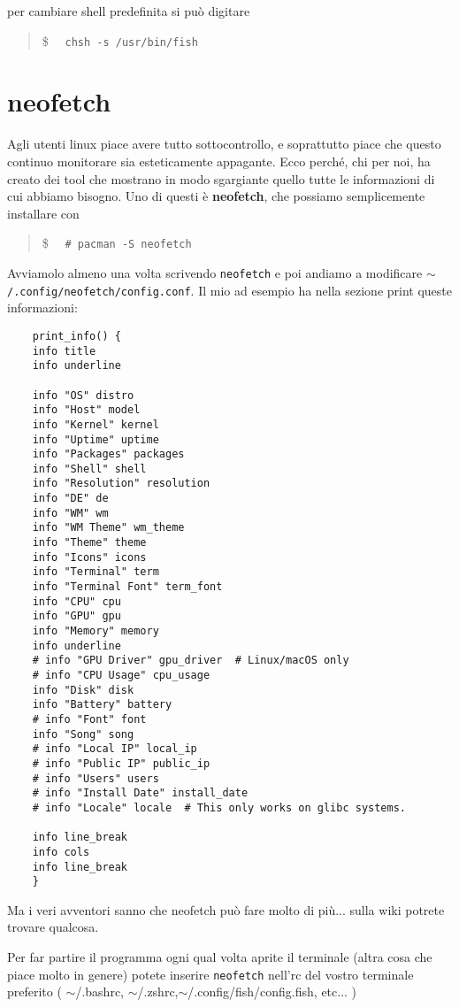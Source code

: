 \documentclass[twoside,italian]{book}
\newcommand{\code}[1]{\texttt{#1}}
\newcommand{\shellcode}[1]{\$$\quad$ \texttt{#1}}
\newcommand{\centcode}[1]{
	\begin{quote}
		\color{code}
		\shellcode{#1}
	\end{quote}
}
\begin{document}
			per cambiare shell predefinita si può digitare \centcode{chsh -s /usr/bin/fish}
		
		\section{neofetch}
			
			Agli utenti linux piace avere tutto sottocontrollo, e soprattutto piace che questo continuo monitorare sia esteticamente appagante. Ecco perché, chi per noi, ha creato dei tool che mostrano in modo sgargiante quello tutte le informazioni di cui abbiamo bisogno.
			Uno di questi è \textbf{neofetch}, che possiamo semplicemente installare con \centcode{\# pacman -S neofetch}Avviamolo almeno una volta scrivendo \code{neofetch} e poi andiamo a modificare  \code{$\sim$/.config/neofetch/config.conf}. Il mio ad esempio ha nella sezione print queste informazioni:\\
\begin{lstlisting}
	print_info() {
	info title
	info underline
	
	info "OS" distro
	info "Host" model
	info "Kernel" kernel
	info "Uptime" uptime
	info "Packages" packages
	info "Shell" shell
	info "Resolution" resolution
	info "DE" de
	info "WM" wm
	info "WM Theme" wm_theme
	info "Theme" theme
	info "Icons" icons
	info "Terminal" term
	info "Terminal Font" term_font
	info "CPU" cpu
	info "GPU" gpu
	info "Memory" memory
	info underline
	# info "GPU Driver" gpu_driver  # Linux/macOS only
	# info "CPU Usage" cpu_usage
	info "Disk" disk
	info "Battery" battery
	# info "Font" font
	info "Song" song
	# info "Local IP" local_ip
	# info "Public IP" public_ip
	# info "Users" users
	# info "Install Date" install_date
	# info "Locale" locale  # This only works on glibc systems.
	
	info line_break
	info cols
	info line_break
	}
\end{lstlisting}
			Ma i veri avventori sanno che neofetch può fare molto di più... sulla wiki potrete trovare qualcosa.
			
			Per far partire il programma ogni qual volta aprite il terminale (altra cosa che piace molto in genere) potete inserire \code{neofetch} nell'rc del vostro terminale preferito ( $\sim$/.bashrc, $\sim$/.zshrc,$\sim$/.config/fish/config.fish, etc... )
			
\end{document}
